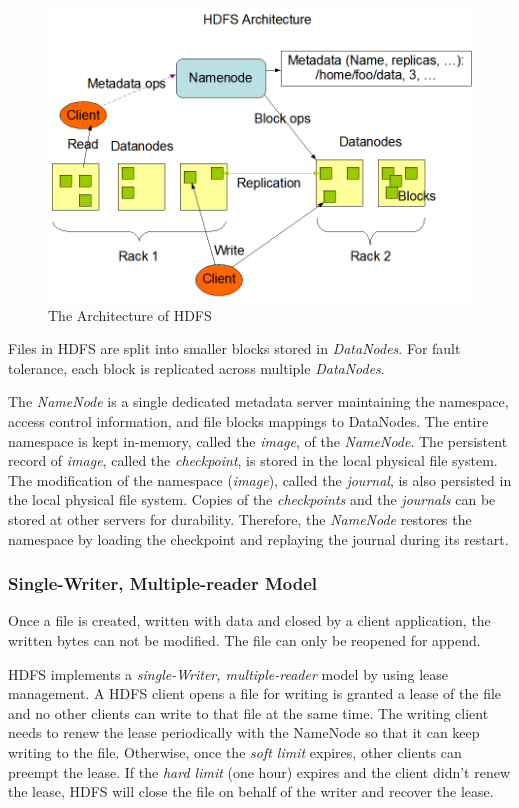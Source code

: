\begin{figure}[ht]
	\centering
	\includegraphics[scale=0.4]{figs/hdfsarchitecturev1.png}
	\caption{The Architecture of HDFS \protect \cite{borthakur2008hdfs}}
	\label{fig:hdfsv1}
\end{figure}

\noindent Files in HDFS are split into smaller blocks stored in \textit{DataNodes}. For fault tolerance, each block is replicated across multiple \textit{DataNodes}.

\noindent The \textit{NameNode} is a single dedicated metadata server maintaining the namespace, access control information, and file blocks mappings to DataNodes. The entire namespace is kept in-memory, called the \textit{image}, of the \textit{NameNode}. The persistent record of \textit{image}, called the \textit{checkpoint}, is stored in the local physical file system. The modification of the namespace (\textit{image}), called the \textit{journal}, is also persisted in the local physical file system. Copies of the \textit{checkpoints} and the \textit{journals} can be stored at other servers for durability. Therefore, the \textit{NameNode} restores the namespace by loading the checkpoint and replaying the journal during its restart.

\subsubsection{Single-Writer, Multiple-reader Model}
Once a file is created, written with data and closed by a client application, the written bytes can not be modified. The file can only be reopened for append.

\noindent HDFS implements a \textit{single-Writer, multiple-reader} model by using lease management. A HDFS client opens a file for writing is granted a lease of the file and no other clients can write to that file at the same time. The writing client needs to renew the lease periodically with the NameNode so that it can keep writing to the file. Otherwise, once the \textit{soft limit} expires, other clients can preempt the lease. If the \textit{hard limit} (one hour) expires and the client didn't renew the lease, HDFS will close the file on behalf of the writer and recover the lease.

